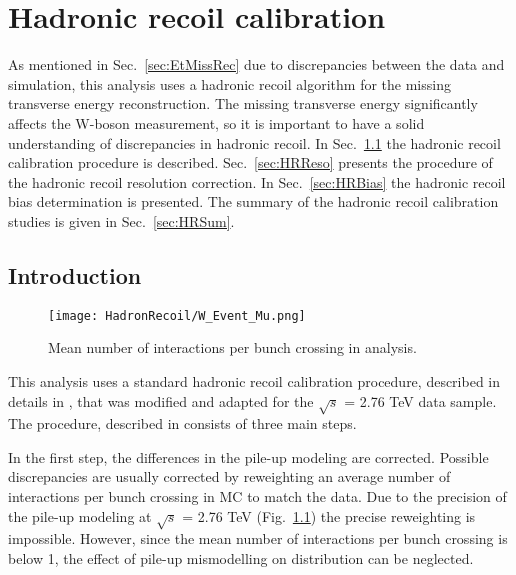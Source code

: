 \chapter{Hadronic recoil calibration}\label{sec:HadrCalib}
\minitoc

As mentioned in Sec.~\ref{sec:EtMissRec} due to discrepancies between the data and simulation, this analysis uses a hadronic recoil algorithm for the missing transverse energy reconstruction. The missing transverse energy significantly affects the W-boson measurement, so it is important to have a solid understanding  of discrepancies in hadronic recoil.
In Sec.~\ref{sec:HRIntro} the hadronic recoil calibration procedure is described. Sec.~\ref{sec:HRReso} presents the procedure of the hadronic recoil resolution correction. In Sec.~\ref{sec:HRBias} the hadronic recoil bias determination is presented. The summary of the hadronic recoil calibration studies is given in Sec.~\ref{sec:HRSum}. 

\section{Introduction}\label{sec:HRIntro}

\begin{figure}[!bp]
\centering
\texttt{[image: HadronRecoil/W\_Event\_Mu.png]}
\caption{Mean number of interactions per bunch crossing in \wenu analysis.}
\label{HadrRecoil:mu}
\end{figure} 

This analysis uses a standard hadronic recoil calibration procedure, described in details in \cite{HRCorrections}, that was modified and adapted for the $\sqrt{s}$ = 2.76 TeV data sample.  The procedure, described in \cite{HRCorrections} consists of three main steps. 

In the first step, the differences in the pile-up modeling are corrected. Possible discrepancies are usually corrected by reweighting an average number of interactions per bunch crossing in MC to match the data.  Due to the precision of the pile-up modeling at $\sqrt{s}$ = 2.76 TeV (Fig.~\ref{HadrRecoil:mu}) the precise reweighting is impossible. However, since the mean number of interactions per bunch crossing is below 1, the effect of pile-up mismodelling  on \etmiss distribution can be neglected.

